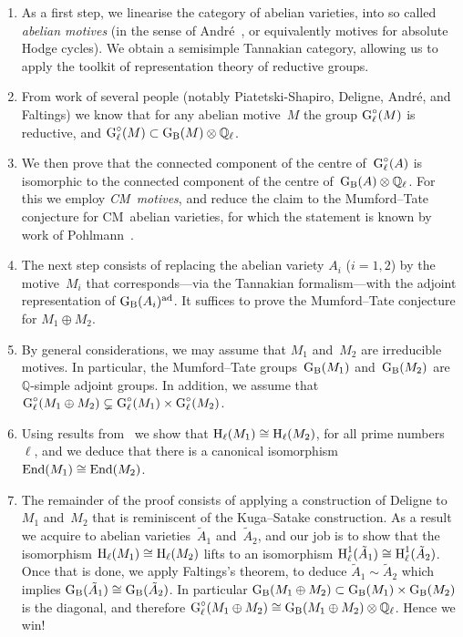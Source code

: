 \documentclass[10pt,twoside,leqno]{article}
\numberwithin{equation}{subsection}
\newcommand{\End}{\textnormal{End}}
\newcommand{\QQ}{\mathbb{Q}}
\newcommand{\QQl}{\QQ_{\ell}}
\newcommand{\ad}{\textnormal{ad}}
\newcommand{\HH}{\textnormal{H}}
\newcommand{\Hl}{\HH_{\ell}}
\newcommand{\GG}{\textnormal{G}}
\newcommand{\GB}{\GG_{\textnormal{B}}}
\newcommand{\Gl}{\GG_{\ell}}
\newcommand{\Glc}{\Gl^{\circ}}
\begin{document}
\begin{enumerate}
 \item As a first step, we linearise the category of abelian varieties,
  into so called \emph{abelian motives} (in the sense of Andr\'e~\cite{An95},
  or equivalently motives for absolute Hodge cycles).
  We obtain a semisimple Tannakian category,
  allowing us to apply the toolkit of representation theory of reductive groups.
 \item From work of several people (notably Piatetski-Shapiro,
  Deligne, Andr\'e, and Faltings) we know that for any abelian motive~$M$
  the group $\Glc(M)$ is reductive, and $\Glc(M) \subset \GB(M) \otimes \QQl$.
 \item We then prove that the connected component of the centre of~$\Glc(A)$ is
  isomorphic to the connected component of the centre of~$\GB(A) \otimes \QQl$.
  For this we employ \emph{CM~motives},
  and reduce the claim to the Mumford--Tate conjecture for CM~abelian varieties,
  for which the statement is known by work of Pohlmann~\cite{Pohl68}.
 \item The next step consists of replacing the abelian variety $A_i$ ($i = 1,2$)
  by the motive~$M_i$ that corresponds---via the Tannakian formalism---with
  the adjoint representation of $\GB(A_i)^\ad$.
  It suffices to prove the Mumford--Tate conjecture for $M_1 \oplus M_2$.
 \item By general considerations,
  we may assume that $M_1$ and~$M_2$ are irreducible motives.
  In particular, the Mumford--Tate groups~$\GB(M_1)$ and~$\GB(M_2)$
  are $\QQ$-simple adjoint groups.
  In addition, we assume that
  $\Glc(M_1 \oplus M_2) \subsetneq \Glc(M_1) \times \Glc(M_2)$.
 \item Using results from~\cite{Co17} we show that $\Hl(M_1) \cong \Hl(M_2)$,
  for all prime numbers~$\ell$,
  and we deduce that there is a canonical isomorphism
  $\End(M_1) \cong \End(M_2)$.
 \item The remainder of the proof consists of applying
  a construction of Deligne to~$M_1$ and~$M_2$
  that is reminiscent of the Kuga--Satake construction.
  As a result we acquire to abelian varieties~$\tilde A_1$ and~$\tilde A_2$,
  and our job is to show that the isomorphism $\Hl(M_1) \cong \Hl(M_2)$
  lifts to an isomorphism $\Hl^1(\tilde A_1) \cong \Hl^1(\tilde A_2)$.
  Once that is done,
  we apply Faltings's theorem, to deduce $\tilde A_1 \sim \tilde A_2$
  which implies $\GB(\tilde A_1) \cong \GB(\tilde A_2)$.
  In particular $\GB(M_1 \oplus M_2) \subset \GB(M_1) \times \GB(M_2)$
  is the diagonal,
  and therefore $\Glc(M_1 \oplus M_2) \cong \GB(M_1 \oplus M_2) \otimes \QQl$.
  Hence we win!
\end{enumerate}
\end{document}
